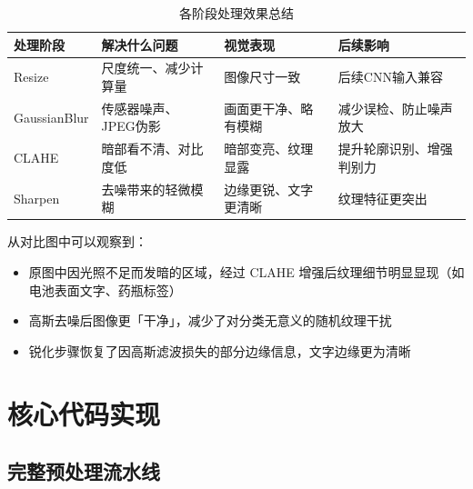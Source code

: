 \documentclass[12pt,a4paper]{ctexart}
\begin{document}
\begin{table}[H]
  \centering
  \caption{各阶段处理效果总结}
  \begin{tabular}{@{}p{2.5cm}p{3.5cm}p{3.5cm}p{4cm}@{}}
    \toprule
    \textbf{处理阶段} & \textbf{解决什么问题} & \textbf{视觉表现} & \textbf{后续影响} \\
    \midrule
    Resize       & 尺度统一、减少计算量 & 图像尺寸一致              & 后续CNN输入兼容           \\
    GaussianBlur & 传感器噪声、JPEG伪影  & 画面更干净、略有模糊       & 减少误检、防止噪声放大    \\
    CLAHE        & 暗部看不清、对比度低  & 暗部变亮、纹理显露         & 提升轮廓识别、增强判别力  \\
    Sharpen      & 去噪带来的轻微模糊    & 边缘更锐、文字更清晰       & 纹理特征更突出            \\
    \bottomrule
  \end{tabular}
  \label{tab:effects}
\end{table}

从对比图中可以观察到：
\begin{itemize}
  \item 原图中因光照不足而发暗的区域，经过 CLAHE 增强后纹理细节明显显现（如电池表面文字、药瓶标签）
  \item 高斯去噪后图像更「干净」，减少了对分类无意义的随机纹理干扰
  \item 锐化步骤恢复了因高斯滤波损失的部分边缘信息，文字边缘更为清晰
\end{itemize}

\section{核心代码实现}

\subsection{完整预处理流水线}
\end{document}
